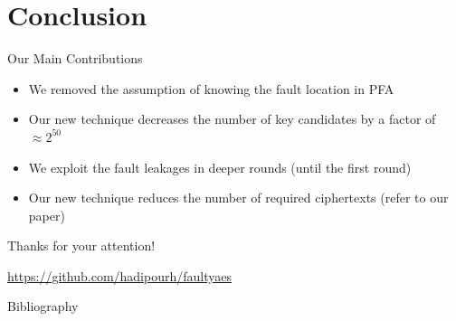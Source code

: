 \documentclass[table,aspectratio=169]{beamer}
\begin{document}
\section{Conclusion}

\begin{frame}{Our Main Contributions}
\begin{itemize}
\item[\faCheckCircleO] We removed the assumption of knowing the fault location in PFA
\item[\faCheckCircleO] Our new technique decreases the number of key candidates by a factor of $\approx 2^{50}$
\item[\faCheckCircleO] We exploit the fault leakages in deeper rounds (until the first round)
\item[\faCheckCircleO] Our new technique reduces the number of required ciphertexts (refer to our paper)
\end{itemize}

\begin{center}
\vspace{0.44cm}

{\large Thanks for your attention!}

\vspace{0.35cm}
\url{https://github.com/hadipourh/faultyaes}
\end{center}
\end{frame}


\begin{frame}[allowframebreaks]{Bibliography}
  \printbibliography
\end{frame}
\end{document}
